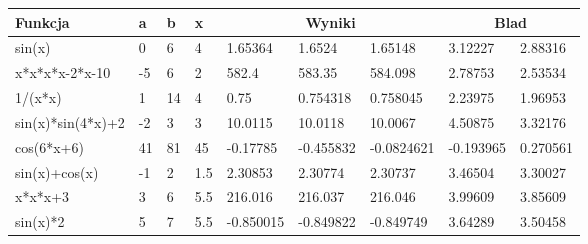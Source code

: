 \begin{table}[h]
  \begin{tabular}{| l | l l l | l l l | l l|}
  \hline
  Funkcja & a & b & x & \multicolumn{3}{|c}{Wyniki} & \multicolumn{2}{|c|}{Blad }\\
  \hline 
sin(x) & 0 & 6 & 4 & 1.65364 & 1.6524 & 1.65148 & 3.12227 & 2.88316\\
x*x*x*x-2*x-10 & -5 & 6 & 2 & 582.4 & 583.35 & 584.098 & 2.78753 & 2.53534\\
1/(x*x) & 1 & 14 & 4 & 0.75 & 0.754318 & 0.758045 & 2.23975 & 1.96953\\
sin(x)*sin(4*x)+2 & -2 & 3 & 3 & 10.0115 & 10.0118 & 10.0067 & 4.50875 & 3.32176\\
cos(6*x+6) & 41 & 81 & 45 & -0.17785 & -0.455832 & -0.0824621 & -0.193965 & 0.270561\\
sin(x)+cos(x) & -1 & 2 & 1.5 & 2.30853 & 2.30774 & 2.30737 & 3.46504 & 3.30027\\
x*x*x+3 & 3 & 6 & 5.5 & 216.016 & 216.037 & 216.046 & 3.99609 & 3.85609\\
sin(x)*2 & 5 & 7 & 5.5 & -0.850015 & -0.849822 & -0.849749 & 3.64289 & 3.50458\\
    \hline  
  \end{tabular}\\\\
  \begin{tabular}{r | l}
  \end{tabular}
\end{table}
